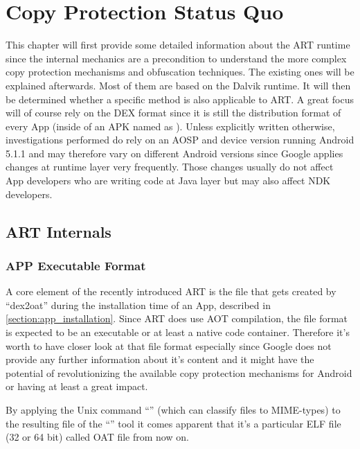 \chapter{Copy Protection Status Quo}
\label{chapter:copy_protection_status_quo}

This chapter will first provide some detailed information about the ART runtime since the internal mechanics are a precondition to understand the more complex copy protection mechanisms and obfuscation techniques. The existing ones will be explained afterwards. Most of them are based on the Dalvik runtime. It will then be determined whether a specific method is also
applicable to ART. A great focus will of course rely on the DEX format since
it is still the distribution format of every App (inside of an APK named as
). Unless explicitly written otherwise, investigations performed do rely on an AOSP and device version running Android 5.1.1 and may therefore vary on different Android versions since Google applies changes
at runtime layer very frequently. Those changes usually do not affect App developers
who are writing code at Java layer but may also affect NDK developers. 

\section{ART Internals}
\label{section:art_internals}

\subsection{APP Executable Format}\label{section:app_executable_format}

A core element of the recently introduced ART is the file that
gets created by ``dex2oat'' during the installation time of an App,
described in \autoref{section:app_installation}.
Since ART does use AOT compilation, the file format is expected
to be an executable or at least a native code container.
Therefore it's worth to have closer look at that file format
especially since Google does not provide any further information
about it's content and it might have the potential of
revolutionizing the available copy protection mechanisms for
Android or having at least a great impact.

By applying the Unix command ``'' (which can classify
files to MIME-types) to the resulting file of the ``''
tool it comes apparent that it's a particular ELF file (32 or 64 bit)
called OAT file from now on.

